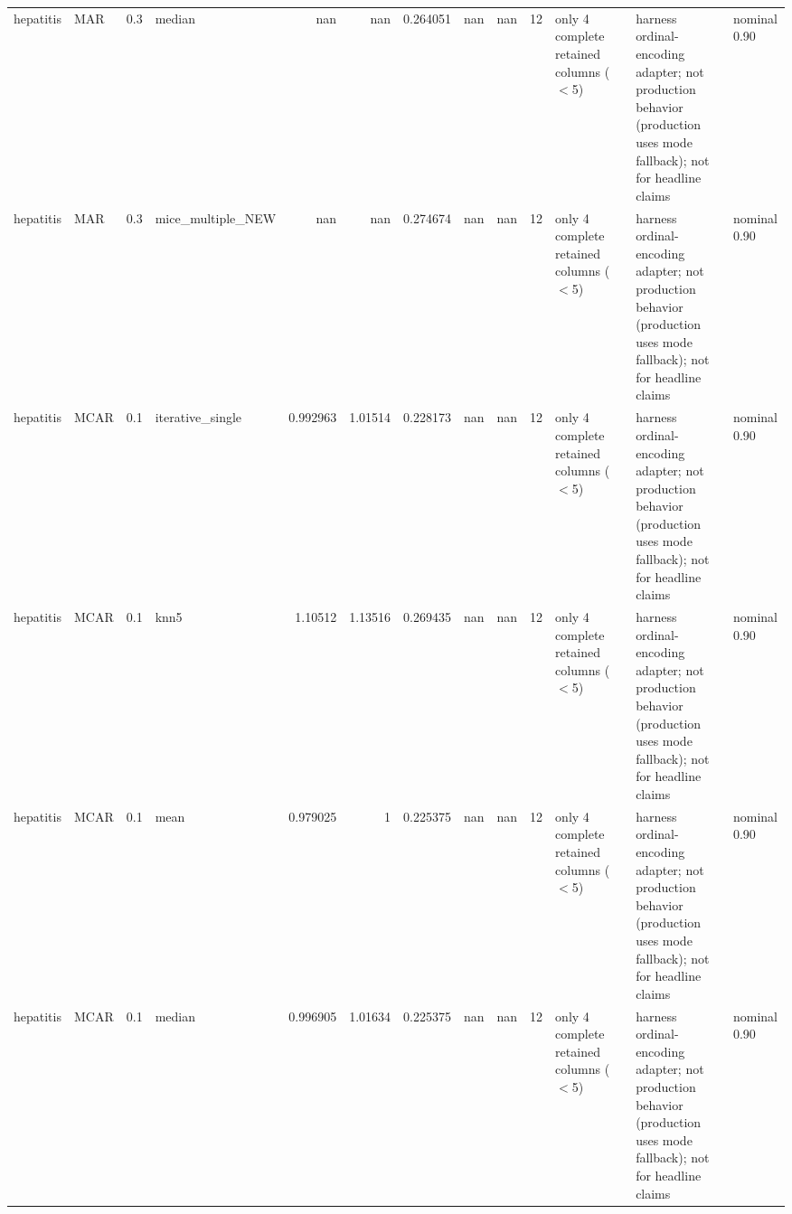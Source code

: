 \begin{table}[ht]
\begin{tabular}{llrlrrrrrrllll}
 hepatitis & MAR         &         0.3 & median            &     nan        &           nan        &                 0.264051 &                   nan          &                       nan        &        12 & only 4 complete retained columns (\ensuremath{<}5) &                                                                       & harness ordinal-encoding adapter; not production behavior (production uses mode fallback); not for headline claims & nominal 0.90              \\
 hepatitis & MAR         &         0.3 & mice\_multiple\_NEW &     nan        &           nan        &                 0.274674 &                   nan          &                       nan        &        12 & only 4 complete retained columns (\ensuremath{<}5) &                                                                       & harness ordinal-encoding adapter; not production behavior (production uses mode fallback); not for headline claims & nominal 0.90              \\
 hepatitis & MCAR        &         0.1 & iterative\_single  &       0.992963 &             1.01514  &                 0.228173 &                   nan          &                       nan        &        12 & only 4 complete retained columns (\ensuremath{<}5) &                                                                       & harness ordinal-encoding adapter; not production behavior (production uses mode fallback); not for headline claims & nominal 0.90              \\
 hepatitis & MCAR        &         0.1 & knn5              &       1.10512  &             1.13516  &                 0.269435 &                   nan          &                       nan        &        12 & only 4 complete retained columns (\ensuremath{<}5) &                                                                       & harness ordinal-encoding adapter; not production behavior (production uses mode fallback); not for headline claims & nominal 0.90              \\
 hepatitis & MCAR        &         0.1 & mean              &       0.979025 &             1        &                 0.225375 &                   nan          &                       nan        &        12 & only 4 complete retained columns (\ensuremath{<}5) &                                                                       & harness ordinal-encoding adapter; not production behavior (production uses mode fallback); not for headline claims & nominal 0.90              \\
 hepatitis & MCAR        &         0.1 & median            &       0.996905 &             1.01634  &                 0.225375 &                   nan          &                       nan        &        12 & only 4 complete retained columns (\ensuremath{<}5) &                                                                       & harness ordinal-encoding adapter; not production behavior (production uses mode fallback); not for headline claims & nominal 0.90              \\

\end{tabular}
\end{table}
